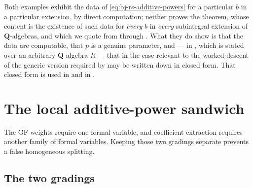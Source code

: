 \begin{remark}
\label{rem:ch44-examples-scope}
Both examples exhibit the data of \eqref{eq:bj-rs-additive-powers} for a
particular $b$ in a particular extension, by direct computation; neither
proves the theorem, whose content is the existence of such data for
\emph{every} $b$ in \emph{every} subintegral extension of
$\mathbf Q$-algebras, and which we quote from \cite{RobertsSingh} through
.  What they do show is that the data are
computable, that $p$ is a genuine parameter, and --- in
, which is stated over an arbitrary
$\mathbf Q$-algebra $R$ --- that in the case relevant to the worked
descent of  the generic version required by
 may be written down in closed form.  That closed
form is used in  and in
.
\end{remark}

\section{The local additive-power sandwich}
\label{sec:ch44-sandwich}

The GF weights require one formal variable, and coefficient extraction
requires another family of formal variables.
Keeping those two gradings separate prevents a false homogeneous splitting.

\subsection{The two gradings}
\label{sec:ch44-two-gradings}

